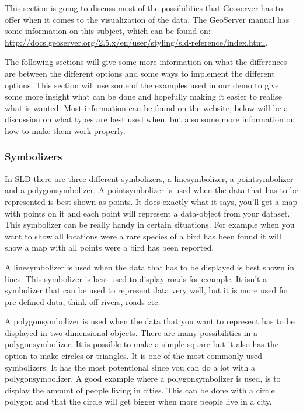 This section is going to discuss most of the possibilities that Geoserver has to offer when it comes to the visualization of the data. The GeoServer manual has some information on this subject, which can be found on: \url{http://docs.geoserver.org/2.5.x/en/user/styling/sld-reference/index.html}.

The following sections will give some more information on what the differences are between the different options and some ways to implement the different options. This section will use some of the examples used in our demo to give some more insight what can be done and hopefully making it easier to realise what is wanted. Most information can be found on the website, below will be a discussion on what types are best used when, but also some more information on how to make them work properly.

\subsubsection{Symbolizers}

In SLD there are three different symbolizers, a linesymbolizer, a pointsymbolizer and a polygonsymbolizer. A pointsymbolizer is used when the data that has to be represented is best shown as points. It does exactly what it says, you'll get a map with points on it and each point will represent a data-object from your dataset. This symbolizer can be really handy in certain situations. For example when you want to show all locations were a rare species of a bird has been found it will show a map with all points were a bird has been reported.

A linesymbolizer is used when the data that has to be displayed is best shown in lines. This symbolizer is best used to display roads for example. It isn't a symbolizer that can be used to represent data very well, but it is more used for pre-defined data, think off rivers, roads etc.

A polygonsymbolizer is used when the data that you want to represent has to be displayed in two-dimensional objects. There are many possibilities in a polygonsymbolizer. It is possible to make a simple square but it also has the option to make circles or triangles. It is one of the most commonly used symbolizers. It has the most potentional since you can do a lot with a polygonsymbolizer. A good example where a polygonsymbolizer is used, is to display the amount of people living in cities. This can be done with a circle polygon and that the circle will get bigger when more people live in a city.

